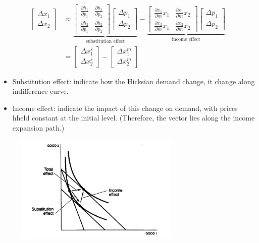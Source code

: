 \begin{align*}
    \begin{bmatrix}
        \Delta x_1 \\ \Delta x_2
    \end{bmatrix}
    &\approx
    \underbrace{
    \begin{bmatrix}
    \frac{\partial h_1}{\partial p_1} &
    \frac{\partial h_1}{\partial p_2} \\
    \frac{\partial h_2}{\partial p_1} &
    \frac{\partial h_2}{\partial p_2}
    \end{bmatrix}
    \begin{bmatrix}
    \Delta p_1 \\ \Delta p_2
    \end{bmatrix}
    }_{\text{substitution effect}}
    - \underbrace{
    \begin{bmatrix}
    \frac{\partial x_1}{\partial m} x_1 &
    \frac{\partial x_1}{\partial m} x_2\\
    \frac{\partial x_2}{\partial m} x_1 &
    \frac{\partial x_2}{\partial m} x_2
    \end{bmatrix}
    \begin{bmatrix}
    \Delta p_1 \\ \Delta p_2
    \end{bmatrix}
    }_{\text{income effect}}
    \\
    &=
    \begin{bmatrix}
    \Delta x_1^s \\ \Delta x_2^s
    \end{bmatrix}
    -
    \begin{bmatrix}
    \Delta x_1^m \\ \Delta x_2^m
    \end{bmatrix}
\end{align*}

\begin{itemize}
    \item Substitution effect: indicate how the Hicksian demand change, it change along indifference curve.
    \item Income effect: indicate the impact of this change on demand, with prices hheld constant at the initial level. (Therefore, the vector lies along the income expansion path.)
\end{itemize}

\begin{figure}[h]
    \center
    \includegraphics[width=0.7\textwidth]{img/fig8-4.png}
    \caption{}
\end{figure}

